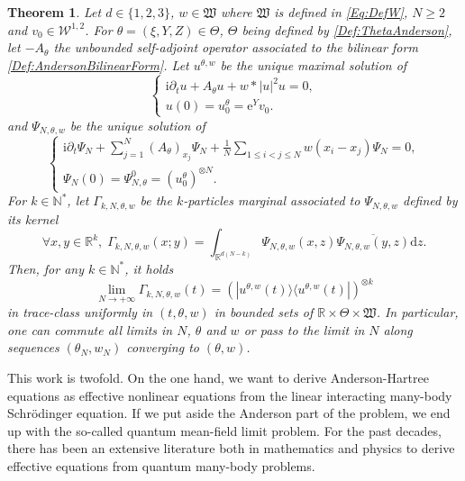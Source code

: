 \documentclass{article}
\def\W{\mathcal W}
\def\R{\mathbb R}
\def\N{\mathbb N}
\def \p {\partial}
\def\d{\mathrm{d}}
\newtheorem{theo}{Theorem}[section]
\theoremstyle{definition}
\numberwithin{equation}{section}
\newcommand{\e}{\mathrm{e}} %
\newcommand{\complexI}{\mathrm{i}} %
\begin{document}
\begin{theo}\label{Th:MeanFieldLimitAndersonHartree}
    Let $d\in\{1,2,3\}$, $w\in\mathfrak{W}$ where $\mathfrak{W}$ is defined in \cref{Eq:DefW}, $N\geqslant 2$ and $v_0\in\W^{1,2}$.
    For $\theta=(\xi,Y,Z)\in\Theta$, $\Theta$ being defined by \cref{Def:ThetaAnderson}, let $-A_\theta$ the unbounded self-adjoint operator associated to the bilinear form \cref{Def:AndersonBilinearForm}. Let $u^{\theta,w}$ be the unique maximal solution of \begin{equation}\label{Eq:AndersonHartree}
        \begin{cases}
        \complexI\p_t u + A_\theta u + w*|u|^2 u = 0,\\
        u(0)=u_0^\theta = \e^{Y}v_0.
        \end{cases}
    \end{equation} 
     and $\Psi_{N,\theta,w}$ be the unique solution of 
    \begin{equation}
        \begin{cases}
        \displaystyle\complexI\p_t\Psi_N+\sum_{j=1}^N (A_\theta)_{x_j}\Psi_N + \frac{1}{N}\sum_{1\leqslant i<j\leqslant N}w(x_i-x_j)\Psi_N=0,\\
        \Psi_N(0)=\Psi_{N,\theta}^0=(u_0^\theta)^{\otimes N}.
        \end{cases}
    \end{equation}
    For $k\in\N^*$, let $\Gamma_{k,N,\theta,w}$ be the $k$-particles marginal associated to $\Psi_{N,\theta,w}$ defined by its kernel
    $$\forall x,y\in\R^k,\; \Gamma_{k,N,\theta,w}(x;y) = \int_{\R^{d(N-k)}}\Psi_{N,\theta,w}(x,z)\overline{\Psi_{N,\theta,w}(y,z)}\d z.$$
    Then, for any $k\in\N^*$, it holds
    $$\lim_{N\to+\infty}\Gamma_{k,N,\theta,w}(t) =\left(|u^{\theta,w}(t)\rangle\langle u^{\theta,w}(t)|\right)^{\otimes k}$$
    in trace-class uniformly in $(t,\theta,w)$ in bounded sets of $\R\times\Theta\times\mathfrak{W}$. In particular, one can commute all limits in $N$, $\theta$ and $w$ or pass to the limit in $N$ along sequences $(\theta_N,w_N)$ converging to $(\theta,w)$.
\end{theo}

This work is twofold. On the one hand, we want to derive Anderson-Hartree equations as effective nonlinear equations from the linear interacting many-body Schrödinger equation. If we put aside the Anderson part of the problem, we end up with the so-called quantum mean-field limit problem. For the past decades, there has been an extensive literature both in mathematics and physics to derive effective equations from quantum many-body problems. 
\end{document}
